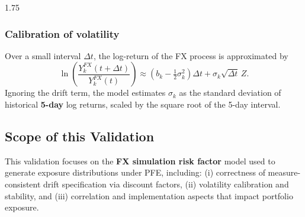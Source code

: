 \begin{spacing}{1.75}
{		\subsubsection{Calibration of volatility}
		Over a small interval $\Delta t$, the log-return of the FX process is approximated by
		\[
		\ln\!\left(\frac{Y_k^{FX}(t+\Delta t)}{Y_k^{FX}(t)}\right)\approx \left(b_k-\tfrac12\sigma_k^2\right)\Delta t+\sigma_k\sqrt{\Delta t}\,Z.
		\]
		Ignoring the drift term, the model estimates $\sigma_k$ as the standard deviation of historical \textbf{5-day} log returns,
		scaled by the square root of the 5-day interval.
		
		\subsection{Scope of this Validation}
		This validation focuses on the \textbf{FX simulation risk factor} model used to generate exposure distributions under PFE, including:
		(i) correctness of measure-consistent drift specification via discount factors,
		(ii) volatility calibration and stability, and
		(iii) correlation and implementation aspects that impact portfolio exposure.
		
	}
	
\end{spacing}
\clearpage
